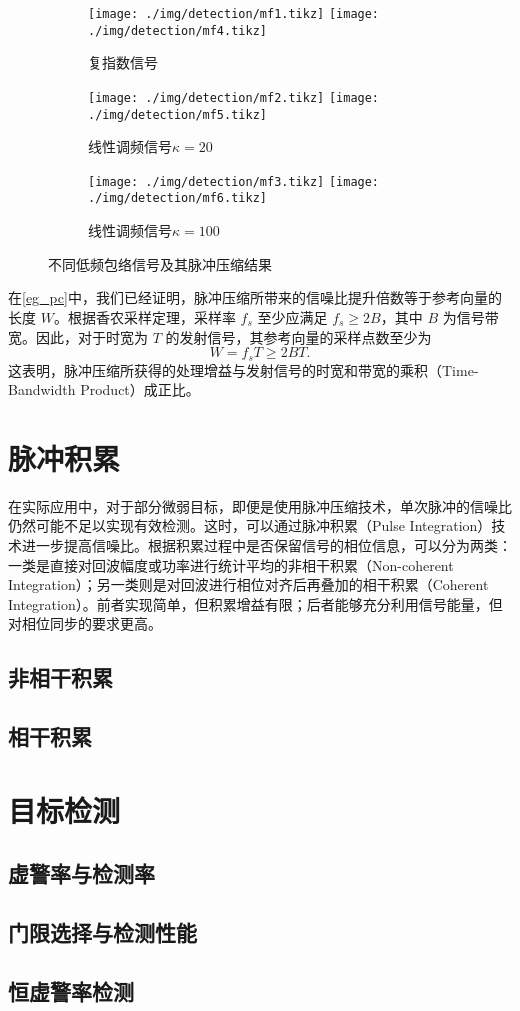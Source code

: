 \begin{figure}[htb!]
    \centering
    \begin{subfigure}{.3\textwidth}
        \centering
        \texttt{[image: ./img/detection/mf1.tikz]}
        \texttt{[image: ./img/detection/mf4.tikz]}
        \caption{复指数信号}
        \label{fig_mf_1}
    \end{subfigure}
    \begin{subfigure}{.3\textwidth}
        \centering
        \texttt{[image: ./img/detection/mf2.tikz]}
        \texttt{[image: ./img/detection/mf5.tikz]}
        \caption{线性调频信号\( \kappa = 20 \)}
        \label{fig_mf_2}
    \end{subfigure}
    \begin{subfigure}{.3\textwidth}
        \centering
        \texttt{[image: ./img/detection/mf3.tikz]}
        \texttt{[image: ./img/detection/mf6.tikz]}
        \caption{线性调频信号\( \kappa=100 \)}
        \label{fig_mf_3}
    \end{subfigure}
    \caption{不同低频包络信号及其脉冲压缩结果}
    \label{fig_mf}
\end{figure}

在\cref{eg_pc}中，我们已经证明，脉冲压缩所带来的信噪比提升倍数等于参考向量的长度 \(W\)。根据香农采样定理，采样率 \(f_s\) 至少应满足 \(f_s \geq 2B\)，其中 \(B\) 为信号带宽。因此，对于时宽为 \(T\) 的发射信号，其参考向量的采样点数至少为
\[
    W = f_s T \geq 2BT.
\]
这表明，脉冲压缩所获得的处理增益与发射信号的时宽和带宽的乘积（Time-Bandwidth Product）成正比。

\section{脉冲积累}
在实际应用中，对于部分微弱目标，即便是使用脉冲压缩技术，单次脉冲的信噪比仍然可能不足以实现有效检测。这时，可以通过脉冲积累（Pulse Integration）技术进一步提高信噪比。根据积累过程中是否保留信号的相位信息，可以分为两类：一类是直接对回波幅度或功率进行统计平均的非相干积累（Non-coherent Integration）；另一类则是对回波进行相位对齐后再叠加的相干积累（Coherent Integration）。前者实现简单，但积累增益有限；后者能够充分利用信号能量，但对相位同步的要求更高。

\subsection{非相干积累}

\subsection{相干积累}

\section{目标检测}
\subsection{虚警率与检测率}
\subsection{门限选择与检测性能}
\subsection{恒虚警率检测}
